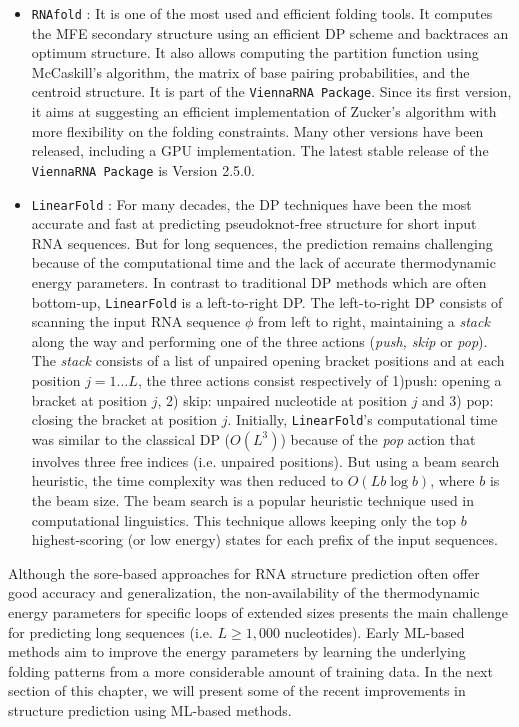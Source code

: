 \begin{itemize}
	\item \texttt{RNAfold} \cite{hofacker1994fast,lorenz11_vienn_packag}: It is one of the most used and efficient folding tools. It computes the MFE secondary structure using an efficient DP scheme and backtraces an optimum structure. It also allows computing the partition function using McCaskill's algorithm, the matrix of base pairing probabilities, and the centroid structure. It is part of the \texttt{ViennaRNA Package}. Since its first version, it aims at suggesting an efficient implementation of Zucker's algorithm with more flexibility on the folding constraints. Many other versions have been released, including a GPU implementation. The latest stable release of the \texttt{ViennaRNA Package} is Version 2.5.0.
	
	\item \texttt{LinearFold} \cite{huang2019linearfold}: For many decades, the DP techniques have been the most accurate and fast at predicting pseudoknot-free structure for short input RNA sequences. But for long sequences, the prediction remains challenging because of the computational time and the lack of accurate thermodynamic energy parameters. In contrast to traditional DP methods which are often bottom-up, \texttt{LinearFold} is a left-to-right DP. The left-to-right DP consists of scanning the input RNA sequence $\phi$ from left to right,  maintaining a \textit{stack} along the way and performing one of the three actions (\textit{push, skip} or \textit{pop}). The \textit{stack} consists of a list of unpaired opening bracket positions and at each position $j = 1\dots L$, the three actions consist respectively of 1)push: opening a bracket at position $j$, 2) skip: unpaired nucleotide at position $j$ and 3) pop: closing the bracket at position $j$. Initially, \texttt{LinearFold}'s computational time was similar to the classical DP ($O(L^3)$) because of the \textit{pop} action that involves three free indices (i.e. unpaired positions). But using a beam search heuristic, the time complexity was then reduced to $O(Lb\log  b)$, where $b$ is the beam size. The beam search is a popular heuristic technique used in computational linguistics. This technique allows keeping only the top $b$ highest-scoring (or low energy) states for each prefix of the input sequences.
\end{itemize}

Although the sore-based approaches for RNA structure prediction often offer good accuracy and generalization,  the non-availability of the thermodynamic energy parameters for specific loops of extended sizes presents the main challenge for predicting long sequences (i.e. $L \geq 1,000$ nucleotides).  Early ML-based methods aim to improve the energy parameters by learning the underlying folding patterns from a more considerable amount of training data.  In the next section of this chapter, we will present some of the recent improvements in structure prediction using ML-based methods.
